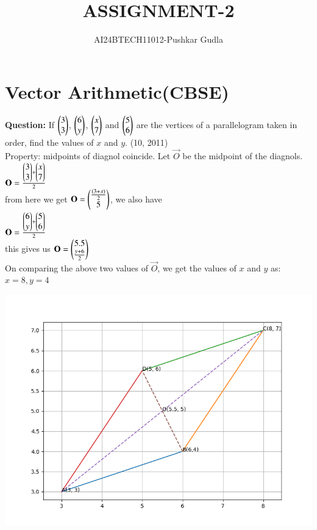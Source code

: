 \documentclass[journal,12pt,onecolumn]{IEEEtran}
\theoremstyle{remark}
\begin{document}

\vspace{3cm}

\title{ASSIGNMENT-2}
\author{AI24BTECH11012-Pushkar Gudla}
\maketitle
\bigskip
\section*{\textbf{Vector Arithmetic(CBSE)}}

\textbf{Question:} If $\begin{pmatrix}3\\3\end{pmatrix}$, $\begin{pmatrix}6\\y\end{pmatrix}$, $\begin{pmatrix}x\\7\end{pmatrix}$ and $\begin{pmatrix}5\\6\end{pmatrix}$ are the vertices of a parallelogram taken in order, find the values of $x$ and $y$. 
		\hfill{(10, 2011)}\\

		\solution Property: midpoints of diagnol coincide. Let $\vec{O}$ be the midpoint of the diagnols.\\

		$\mathbf{O}=\frac{\begin{pmatrix}3\\3\end{pmatrix}+\begin{pmatrix}x\\7\end{pmatrix}}{2}$\\
		from here we get $\mathbf{O}=\begin{pmatrix}\frac{(3+x)}{2} \\ 5\end{pmatrix}$, we also have\\
		$\mathbf{O}=\frac{\begin{pmatrix}6\\y\end{pmatrix}+\begin{pmatrix}5\\6\end{pmatrix}}{2}$\\
		this gives us $\mathbf{O}=\begin{pmatrix}5.5\\\frac{y+6}{2}\end{pmatrix}$\\
		On comparing the above two values of $\vec{O}$, we get the values of $x$ and $y$ as:\\
		$x=8, y=4$\\
\graphicspath{ {./figs/} }
		\includegraphics[scale=0.7]{parallelogram}
\end{document}
